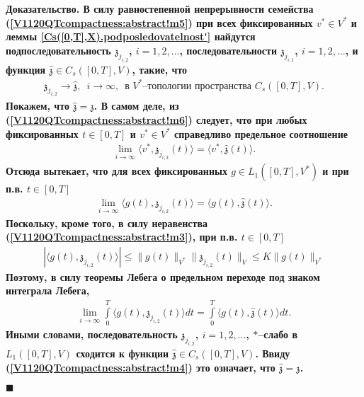 \documentclass{report}
\newenvironment{Proof}{\par\noindent\bf Доказательство.\rm}{ $\blacksquare$\par}
\begin{document}
\begin{Proof}
В силу равностепенной непрерывности семейства (\ref{V1120QTcompactness:abstract!m5}) при всех фиксированных $v^*\in V^*$ и леммы \ref{Cs([0,T],X).podposledovatelnost'} найдутся
подпоследовательность $\mathfrak{z}_{j_{i,2}}$, $i=1,2,\dots$, последовательности $\mathfrak{z}_{j_{i,1}}$, $i=1,2,\dots$, и функция $\hat{\mathfrak{z}}\in C_s([0,T],V)$, такие, что
\begin{gather}\label{V1120QTcompactness:abstract!m6}
\mathfrak{z}_{j_{i,2}}\to\hat{\mathfrak{z}},\,\,\,i\to\infty,\,\,\,\mbox{в $V^*$--топологии пространства $C_s([0,T],V)$}.
\end{gather}
Покажем, что $\hat{\mathfrak{z}}=\mathfrak{z}$. В самом деле, из (\ref{V1120QTcompactness:abstract!m6}) следует, что при любых фиксированных $t\in[0,T]$ и $v^*\in V^*$ справедливо
предельное соотношение
\begin{gather*}
\lim\limits_{i\to\infty}\langle v^*,\mathfrak{z}_{j_{i,2}}(t)\rangle=\langle v^*,\hat{\mathfrak{z}}(t)\rangle.
\end{gather*}
Отсюда вытекает, что для всех фиксированных $g\in L_1([0,T],V^*)$ и при п.в. $t\in[0,T]$
\begin{gather*}
\lim\limits_{i\to\infty}\langle g(t),\mathfrak{z}_{j_{i,2}}(t)\rangle=\langle g(t),\hat{\mathfrak{z}}(t)\rangle.
\end{gather*}
Поскольку, кроме того, в силу неравенства (\ref{V1120QTcompactness:abstract!m3}), при п.в. $t\in[0,T]$
\begin{gather*}
|\langle g(t),\mathfrak{z}_{j_{i,2}}(t)\rangle|\leqslant\|g(t)\|_{V^*}\|\mathfrak{z}_{j_{i,2}}(t)\|_V\leqslant K\|g(t)\|_{V^*}
\end{gather*}
Поэтому, в силу теоремы Лебега о предельном переходе под знаком интеграла Лебега,
\begin{gather*}
\lim\limits_{i\to\infty}\int\limits_0^T\langle g(t),\mathfrak{z}_{j_{i,2}}(t)\rangle dt=\int\limits_0^T\langle g(t),\hat{\mathfrak{z}}(t)
\rangle dt.
\end{gather*}
Иными словами, последовательность $\mathfrak{z}_{j_{i,2}}$, $i=1,2,\dots$, $*$--слабо в $L_1([0,T],V)$ сходится к функции $\hat{\mathfrak{z}}\in C_s([0,T],V)$. Ввиду
(\ref{V1120QTcompactness:abstract!m4}) это означает, что $\hat{\mathfrak{z}}=\mathfrak{z}$.


\end{Proof}
\end{document}

